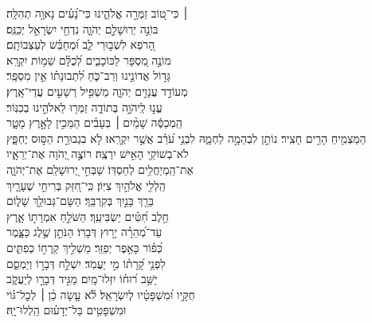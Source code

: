\documentclass[twoside, openany, parskip=half, 11pt]{book}
\begin{document}
\begin{narrow}
 ׀ \hfill \break
כִּי־ט֭וֹב זַמְּרָ֣ה אֱלֹהֵ֑ינוּ \hfill כִּי־נָ֝עִ֗ים נָאוָ֥ה תְהִלָּֽה׃\\
בּוֹנֵ֣ה יְרֽוּשָׁלַ֣‍ִם יְהֹוָ֑ה \hfill נִדְחֵ֖י יִשְׂרָאֵ֣ל יְכַנֵּֽס׃\\
הָ֭רֹפֵא לִשְׁב֣וּרֵי לֵ֑ב \hfill וּ֝מְחַבֵּ֗שׁ לְעַצְּבוֹתָֽם׃\\
מוֹנֶ֣ה מִ֭סְפָּר לַכּוֹכָבִ֑ים \hfill לְ֝כֻלָּ֗ם שֵׁמ֥וֹת יִקְרָֽא׃\\
גָּד֣וֹל אֲדוֹנֵ֣ינוּ וְרַב־כֹּ֑חַ \hfill לִ֝תְבוּנָת֗וֹ אֵ֣ין מִסְפָּֽר׃ \\
מְעוֹדֵ֣ד עֲנָוִ֣ים יְהֹוָ֑ה \hfill מַשְׁפִּ֖יל רְשָׁעִ֣ים עֲדֵי־אָֽרֶץ׃\\
עֱנ֣וּ לַֽיהֹוָ֣ה בְּתוֹדָ֑ה \hfill זַמְּר֖וּ לֵאלֹהֵ֣ינוּ בְכִנּֽוֹר׃\\
הַֽמְכַסֶּ֬ה שָׁמַ֨יִם ׀ בְּעָבִ֗ים \hfill הַמֵּכִ֣ין לָאָ֣רֶץ מָטָ֑ר\\ הַמַּצְמִ֖יחַ הָרִ֣ים חָצִֽיר׃ \hfill 
נוֹתֵ֣ן לִבְהֵמָ֣ה לַחְמָ֑הּ לִבְנֵ֥י עֹ֝רֵ֗ב אֲשֶׁ֣ר יִקְרָֽאוּ׃ \hfill 
לֹ֤א בִגְבוּרַ֣ת הַסּ֣וּס יֶחְפָּ֑ץ \\ לֹא־בְשׁוֹקֵ֖י הָאִ֣ישׁ יִרְצֶֽה׃ \hfill 
רוֹצֶ֣ה יְ֭הֹוָה אֶת־יְרֵאָ֑יו\\ אֶת־הַֽמְיַחֲלִ֥ים לְחַסְדּֽוֹ׃ \hfill 
שַׁבְּחִ֣י יְ֭רוּשָׁלַ‍ִם אֶת־יְהֹוָ֑ה\\ הַֽלְלִ֖י אֱלֹהַ֣יִךְ צִיּֽוֹן׃ \hfill 
כִּֽי־חִ֭זַּק בְּרִיחֵ֣י שְׁעָרָ֑יִךְ\\ בֵּרַ֖ךְ בָּנַ֣יִךְ בְּקִרְבֵּֽךְ׃ \hfill 
הַשָּׂם־גְּבוּלֵ֥ךְ שָׁל֑וֹם\\ חֵ֥לֶב חִ֝טִּ֗ים יַשְׂבִּיעֵֽךְ׃ \hfill 
הַשֹּׁלֵ֣חַ אִמְרָת֣וֹ אָ֑רֶץ\\ עַד־מְ֝הֵרָ֗ה יָר֥וּץ דְּבָרֽוֹ׃ \hfill 
הַנֹּתֵ֣ן שֶׁ֣לֶג כַּצָּ֑מֶר\\ כְּ֝פ֗וֹר כָּאֵ֥פֶר יְפַזֵּֽר׃ \hfill 
מַשְׁלִ֣יךְ קַֽרְח֣וֹ כְפִתִּ֑ים\\ לִפְנֵ֥י קָ֝רָת֗וֹ מִ֣י יַעֲמֹֽד׃ \hfill 
יִשְׁלַ֣ח דְּבָר֣וֹ וְיַמְסֵ֑ם\\ יַשֵּׁ֥ב ר֝וּח֗וֹ יִזְּלוּ־מָֽיִם׃ \hfill 
מַגִּ֣יד דְּבָרָ֣ו לְיַעֲקֹ֑ב\\ חֻקָּ֥יו וּ֝מִשְׁפָּטָ֗יו לְיִשְׂרָאֵֽל׃ \hfill 
לֹ֘א עָ֤שָׂה כֵ֨ן ׀ לְכׇל־גּ֗וֹי\\ וּמִשְׁפָּטִ֥ים בַּל־יְדָע֗וּם \hfill  הַֽלְלוּ־יָֽהּ׃ 



\end{narrow}
\end{document}

